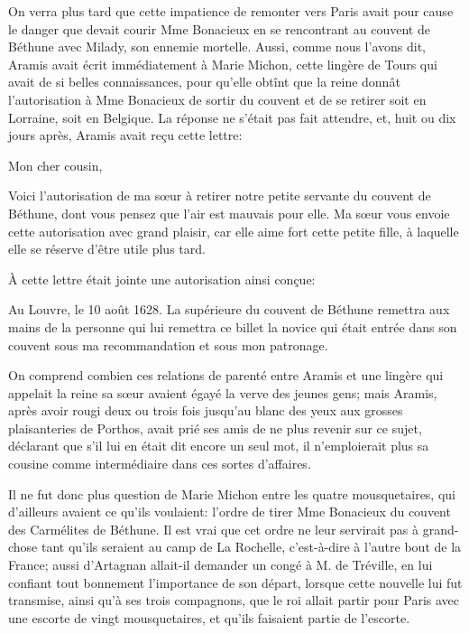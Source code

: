 On verra plus tard que cette impatience de remonter vers Paris avait pour cause le danger que devait courir Mme Bonacieux en se rencontrant au couvent de Béthune avec Milady, son ennemie mortelle. Aussi, comme nous l'avons dit, Aramis avait écrit immédiatement à Marie Michon, cette lingère de Tours qui avait de si belles connaissances, pour qu'elle obtînt que la reine donnât l'autorisation à Mme Bonacieux de sortir du couvent et de se retirer soit en Lorraine, soit en Belgique. La réponse ne s'était pas fait attendre, et, huit ou dix jours après, Aramis avait reçu cette lettre: 


\begin{mail}{}{Mon cher cousin,}
	
Voici l'autorisation de ma sœur à retirer notre petite servante du couvent de Béthune, dont vous pensez que l'air est mauvais pour elle. Ma sœur vous envoie cette autorisation avec grand plaisir, car elle aime fort cette petite fille, à laquelle elle se réserve d'être utile plus tard.
\end{mail}

À cette lettre était jointe une autorisation ainsi conçue:

\begin{mail}{Au Louvre, le 10 août 1628.}{}
La supérieure du couvent de Béthune remettra aux mains de la personne qui lui remettra ce billet la novice qui était entrée dans son couvent sous ma recommandation et sous mon patronage.
\end{mail}


On comprend combien ces relations de parenté entre Aramis et une lingère qui appelait la reine sa sœur avaient égayé la verve des jeunes gens; mais Aramis, après avoir rougi deux ou trois fois jusqu'au blanc des yeux aux grosses plaisanteries de Porthos, avait prié ses amis de ne plus revenir sur ce sujet, déclarant que s'il lui en était dit encore un seul mot, il n'emploierait plus sa cousine comme intermédiaire dans ces sortes d'affaires. 

Il ne fut donc plus question de Marie Michon entre les quatre mousquetaires, qui d'ailleurs avaient ce qu'ils voulaient: l'ordre de tirer Mme Bonacieux du couvent des Carmélites de Béthune. Il est vrai que cet ordre ne leur servirait pas à grand-chose tant qu'ils seraient au camp de La Rochelle, c'est-à-dire à l'autre bout de la France; aussi d'Artagnan allait-il demander un congé à M. de Tréville, en lui confiant tout bonnement l'importance de son départ, lorsque cette nouvelle lui fut transmise, ainsi qu'à ses trois compagnons, que le roi allait partir pour Paris avec une escorte de vingt mousquetaires, et qu'ils faisaient partie de l'escorte. 


